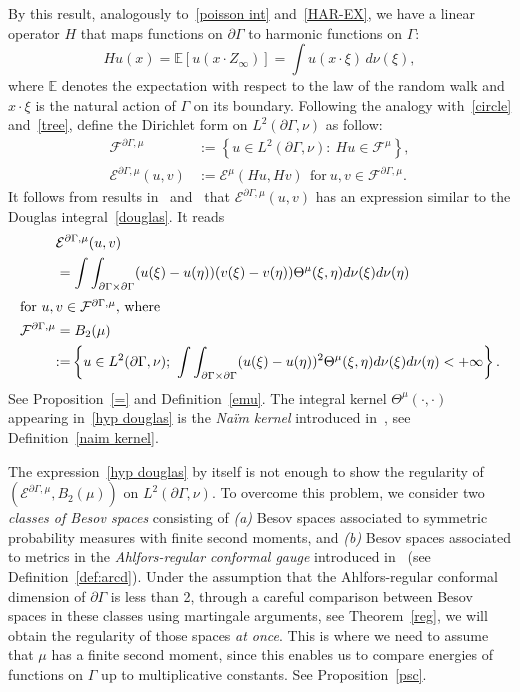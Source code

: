 \documentclass[AHL,Unicode,longabstracts,published]{cedram}
\newcommand{\ce}{\mathcal{E}}
\newcommand{\cf}{\mathcal{F}}
\newcommand{\E}{\mathbb{E}}
\begin{document}
By this result, analogously to~\eqref{poisson int} and~\eqref{HAR-EX}, we have a linear operator $H$ that maps functions on $\partial\Gamma$ to harmonic functions on $\Gamma$:
\[
Hu(x)=\E[u(x\cdot Z_\infty)]=\int u(x\cdot\xi)\, d\nu(\xi),
\]
where $\E$ denotes the expectation with respect to the law of the random walk and $x\cdot\xi$ is the natural action of $\Gamma$ on its boundary.
Following the analogy with~\eqref{circle} and~\eqref{tree}, define the Dirichlet form on $L^2(\partial\Gamma,\nu)$ as follow:
\begin{align*}
\cf^{\partial\Gamma,\mu}&:=\left\{u\in L^2(\partial\Gamma,\nu):\ Hu\in \cf^{\mu}\right\},\\
\ce^{\partial\Gamma,\mu}(u,v)&:=\ce^{\mu}(Hu,Hv)\ \ \text{for}\ u,v\in\cf^{\partial\Gamma,\mu}.
\end{align*}
It follows from results in~\cite{Na} and~\cite{Sil} that $\ce^{\partial\Gamma,\mu}(u,v)$ has an expression similar to the Douglas integral~\eqref{douglas}. It reads
\begin{align}
&\ce^{\partial\Gamma,\mu}(u,v)\label{hyp douglas}\\
&=\int\int_{\partial\Gamma\times\partial\Gamma}(u(\xi)-u(\eta))(v(\xi)-v(\eta))\Theta^{\mu}(\xi,\eta)d\nu(\xi)d\nu(\eta)\nonumber\\
\intertext{for $u,v\in\cf^{\partial\Gamma,\mu}$, where}
\cf^{\partial\Gamma,\mu}&=B_2(\mu)\nonumber\\
&{:=} \left\{u\in L^2(\partial\Gamma,\nu);\ \int\int_{\partial\Gamma\times\partial\Gamma}(u(\xi)-u(\eta))^2\Theta^{\mu}(\xi,\eta)d\nu(\xi)d\nu(\eta)<+\infty\right\}.
\nonumber
\end{align}
See Proposition~\ref{=} and Definition~\ref{emu}. The integral kernel $\Theta^{\mu}(\cdot,\cdot)$ appearing in~\eqref{hyp douglas} is the \emph{Na\"{i}m kernel} introduced in~\cite{Na}, see Definition~\ref{naim kernel}.

The expression~\eqref{hyp douglas} by itself is not enough to show the regularity of $(\ce^{\partial\Gamma,\mu}, B_2(\mu))$ on $L^2(\partial\Gamma,\nu)$. To overcome this problem, we consider two \emph{classes of Besov spaces} consisting of \emph{(a)} Besov spaces associated to symmetric probability measures with finite second moments, and \emph{(b)} Besov spaces associated to metrics in the \emph{Ahlfors-regular conformal gauge} introduced in~\cite{BP} (see Definition~\ref{def:arcd}). Under the assumption that the Ahlfors-regular conformal dimension of $\partial\Gamma$ is less than 2, through a careful comparison between Besov spaces in these classes using martingale arguments, see Theorem~\ref{reg}, we will obtain the regularity of those spaces \emph{at once}. This is where we need to assume that $\mu$ has a finite second moment, since this enables us to compare energies of functions on $\Gamma$ up to multiplicative constants. See Proposition~\ref{psc}.
\end{document}
